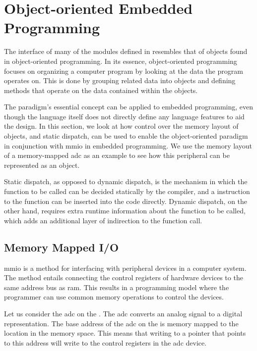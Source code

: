 \section{Object-oriented Embedded Programming}
\label{sec:impl:oo}

The interface of many of the modules defined in {\emlib} resembles that of objects found in object-oriented programming.
In its essence, object-oriented programming focuses on organizing a computer program by looking at the data the program operates on.
This is done by grouping related data into objects and defining methods that operate on the data contained within the objects.

The paradigm's essential concept can be applied to embedded {\C} programming, even though the language itself does not directly define any language features to aid the design.
In this section, we look at how control over the memory layout of objects, and static dispatch, can be used to enable the object-oriented paradigm in conjunction with \gls{mmio} in embedded programming.
We use the memory layout of a memory-mapped \gls{adc} as an example to see how this peripheral can be represented as an object.

Static dispatch, as opposed to dynamic dispatch, is the mechanism in which the function to be called can be decided statically by the compiler, and a  instruction to the function can be inserted into the code directly.
Dynamic dispatch, on the other hand, requires extra runtime information about the function to be called, which adds an additional layer of indirection to the function call.


\subsection{Memory Mapped I/O}
\label{ssec:memory_mapped_io}

\gls{mmio} is a method for interfacing with peripheral devices in a computer system.
The method entails connecting the control registers of hardware devices to the same address bus as \gls{ram}.
This results in a programming model where the programmer can use common memory operations to control the devices.

Let us consider the \gls{adc} on the {\gecko}.
The \gls{adc} converts an analog signal to a digital representation.
The base address of the \gls{adc} on the {\gecko} is memory mapped to the location  in the memory space.
This means that writing to a pointer that points to this address will write to the control registers in the \gls{adc} device.

